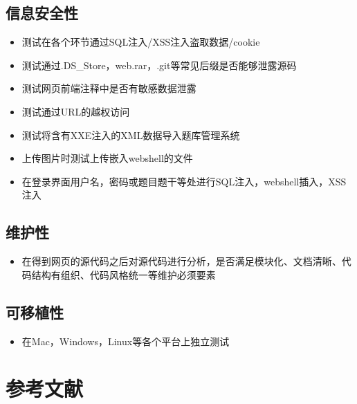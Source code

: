 \documentclass[hyperref, a4paper]{ctexart}
\providecommand{\tightlist}{%
  \setlength{\itemsep}{0pt}\setlength{\parskip}{0pt}}
\begin{document}
\hypertarget{ux4fe1ux606fux5b89ux5168ux6027}{%
\subsection{信息安全性}\label{ux4fe1ux606fux5b89ux5168ux6027}}

\begin{itemize}
\tightlist
\item
  测试在各个环节通过SQL注入/XSS注入盗取数据/cookie
\item
  测试通过.DS\_Store，web.rar，.git等常见后缀是否能够泄露源码
\item
  测试网页前端注释中是否有敏感数据泄露
\item
  测试通过URL的越权访问
\item
  测试将含有XXE注入的XML数据导入题库管理系统
\item
  上传图片时测试上传嵌入webshell的文件
\item
  在登录界面用户名，密码或题目题干等处进行SQL注入，webshell插入，XSS注入
\end{itemize}

\hypertarget{ux7ef4ux62a4ux6027}{%
\subsection{维护性}\label{ux7ef4ux62a4ux6027}}

\begin{itemize}
\tightlist
\item
  在得到网页的源代码之后对源代码进行分析，是否满足模块化、文档清晰、代码结构有组织、代码风格统一等维护必须要素
\end{itemize}

\hypertarget{ux53efux79fbux690dux6027}{%
\subsection{可移植性}\label{ux53efux79fbux690dux6027}}

\begin{itemize}
\tightlist
\item
  在Mac，Windows，Linux等各个平台上独立测试
\end{itemize}

\pagebreak

\hypertarget{ux53c2ux8003ux6587ux732e}{%
\section*{参考文献}\label{ux53c2ux8003ux6587ux732e}}
\end{document}
